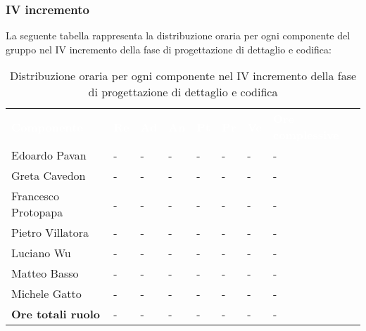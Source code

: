 \subsubsection{IV incremento}
La seguente tabella rappresenta la distribuzione oraria per ogni componente del gruppo nel IV incremento della fase di progettazione di dettaglio e codifica:
\begin{table}[!htbp]
\begin{center}
\renewcommand{\arraystretch}{1.25}
\begin{tabular}{ m{}<{\centering}  m{}<{\centering} m{}<{\centering} m{}<{\centering}  m{}<{\centering}  m{}<{\centering}  m{}<{\centering}  m{}<{\centering}   }
	\rowcolor{darkblue}
	\textcolor{white}{\textbf{Componente}} &\textcolor{white}{\textbf{Re}}&\textcolor{white}{\textbf{Ad}}&\textcolor{white}{\textbf{An}}&\textcolor{white}{\textbf{Pt}}&\textcolor{white}{\textbf{Pr}}&\textcolor{white}{\textbf{Ve}}&\textcolor{white}{\textbf{Ore complessive}}\\ 

	Edoardo Pavan & - & - & - & - & - & - & -\\	

	Greta Cavedon & - & - & - & - & - & - & -\\
	
	Francesco Protopapa & - & - & - & - & - & - & -\\
	
	Pietro Villatora & - & - & - & - & - & - & -\\
	
	Luciano Wu & - & - & - & - & - & - & -\\
	
	Matteo Basso & - & - & - & - & - & - & -\\
	
	Michele Gatto & - & - & - & - & - & - & -\\
	
	\textbf{Ore totali ruolo} & - & - & - & - & - & - & -\\

\end{tabular}
\caption{Distribuzione oraria per ogni componente nel IV incremento della fase di progettazione di dettaglio e codifica}
\end{center}
\end{table}

